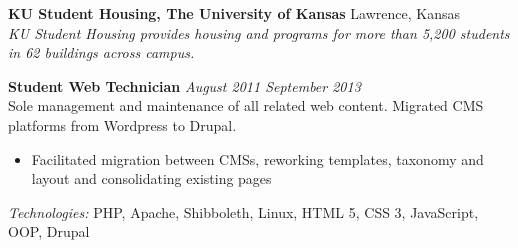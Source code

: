 \documentclass[10pt]{extarticle}
\begin{document}
\textbf{KU Student Housing, The University of Kansas} \hfill Lawrence, Kansas \\
\textit{KU Student Housing provides housing and programs for more than 5,200 students in 62 buildings across campus.} \\
\begin{addmargin}[1em]{0em}
  \textbf{Student Web Technician} \hfill \textit{August 2011 \textendash{} September 2013} \\
  Sole management and maintenance of all related web content. Migrated CMS platforms from Wordpress to Drupal. \\
  \vspace{-1.1em}
  \begin{itemize}
    \item Facilitated migration between CMSs, reworking templates, taxonomy and layout and consolidating existing pages
  \end{itemize}
  \textit{Technologies:} PHP, Apache, Shibboleth, Linux, HTML 5, CSS 3, JavaScript, OOP, Drupal
\end{addmargin}
\end{document}
